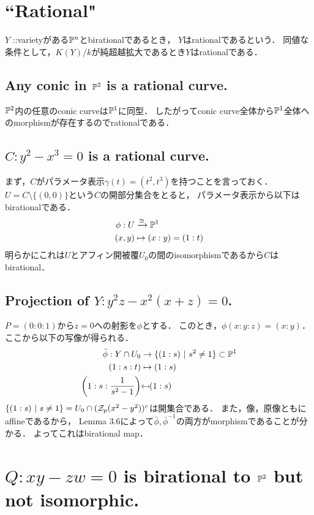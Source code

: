 \documentclass[a4paper]{jsarticle}
\begin{document}
\section{``Rational"} %
    $Y$ ::varietyがある$\mathbb{P}^n$とbirationalであるとき，
    $Y$はrationalであるという．
    同値な条件として，$K(Y)/k$が純超越拡大であるとき$Y$はrationalである．

    \subsection{Any conic in $\mathbb{P}^2$ is a rational curve.}
    $\mathbb{P}^2$内の任意のconic curveは$\mathbb{P}^1$に同型．
    したがってconic curve全体から$\mathbb{P}^1$全体へのmorphismが存在するのでrationalである．

    \subsection{$C:y^2-x^3=0$ is a rational curve.}
    まず，$C$がパラメータ表示$\gamma(t)=(t^2,t^3)$を持つことを言っておく．
    $U=C \setminus \{(0,0)\}$という$C$の開部分集合をとると，
    パラメータ表示から以下はbirationalである．
    \begin{align*}
        \phi: U &\xrightarrow{\cong} \mathbb{P}^1 \\
        (x,y) &\mapsto (x:y)=(1:t)
    \end{align*}
    明らかにこれは$U$とアフィン開被覆$U_0$の間のisomorphismであるから$C$はbirational．

    \subsection{Projection of $Y:y^2 z - x^2 (x + z)=0$.}
    $P=(0:0:1)$から$z=0$への射影を$\phi$とする．
    このとき，$\phi(x:y:z)=(x:y)$．
    ここから以下の写像が得られる．
    \begin{align*}
        \bar{\phi}:
            Y \cap U_0 &\to \{(1:s) ~|~ s^2 \neq 1\} \subset \proj^1 \\
            (1:s:t) &\mapsto (1:s) \\
            \left( 1:s:\frac{1}{s^2-1} \right) &\mapedfrom (1:s)\\
    \end{align*}
    $\{(1:s) ~|~ s \neq 1\}=U_0 \cap (\mathcal{Z}_p(x^2-y^2))^c$は開集合である．
    また，像，原像ともにaffineであるから，
    Lemma 3.6によって$\bar{\phi}, \bar{\phi}^{-1}$の両方がmorphismであることが分かる．
    よってこれはbirational map．

\section{$Q:xy-zw=0$ is birational to $\mathbb{P}^2$ but not isomorphic.} %
\end{document}
